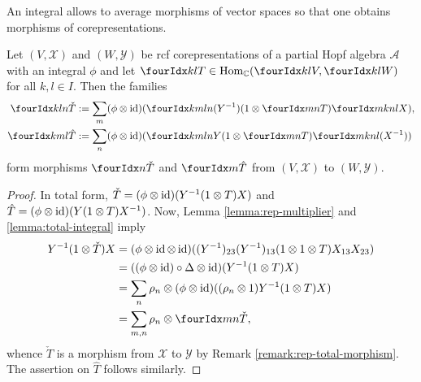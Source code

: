 An integral allows to average morphisms of vector spaces so that one
obtains morphisms of corepresentations. 
\begin{Lem} \label{lem:rep-average}  Let $(V,\mathscr{X})$ and
  $(W,\mathscr{Y})$ be rcf corepresentations of  a partial
  Hopf algebra $\mathscr{A}$ with an integral $\phi$ and let
  $\Gru{T}{k}{l} \in \Hom_{\C}(\Gru{V}{k}{l},\Gru{W}{k}{l})$ for all $k,l\in I$. Then the families
  \begin{align*}
    \Gr{\check T}{k}{l}{}{n} &:= \sum_{m} (\phi \otimes
    \id)(\Gr{(Y^{-1})}{k}{l}{m}{n}(1\otimes
    \Gru{T}{m}{n})\Gr{X}{m}{n}{k}{l}), \\
    \Gr{\hat T}{k}{l}{m}{} &:= \sum_{n} (\phi \otimes
    \id)(\Gr{Y}{k}{l}{m}{n}(1\otimes
    \Gru{T}{m}{n})\Gr{(X^{-1})}{m}{n}{k}{l})
  \end{align*}
form  morphisms $\Grd{\check{T}}{}{n}$ and $\Grd{\hat{T}}{m}{}$ from $(V,\mathscr{X})$ to $(W,\mathscr{Y})$. %
\end{Lem} 
\begin{proof}
  In total form, $\check{T}=(\phi \otimes \operatorname{id})(Y^{-1}(1 \otimes T)X)$
  and $\hat{T}=(\phi \otimes \operatorname{id})(Y(1 \otimes T)X^{-1})$.  Now, Lemma
  \ref{lemma:rep-multiplier} and \ref{lemma:total-integral} 
  imply
  \begin{align*}
    Y^{-1}(1 \otimes \check{T})X &= (\phi \otimes \id \otimes
    \id)((Y^{-1})_{23}(Y^{-1})_{13}(1 \otimes 1
    \otimes T)X_{13}X_{23})  \\
    &= ((\phi \otimes\id) \circ \Delta  \otimes \id)(Y^{-1}(1 \otimes T)X) \\
    &= \sum_{n} \rho_{n} \otimes (\phi \otimes \id)((\rho_{n} \otimes
    1)Y^{-1}(1 \otimes T)X)  \\
    &= \sum_{m,n} \rho_{n} \otimes \Gru{\check T}{m}{n},
  \end{align*}
  whence $\check{T}$ is a morphism from $\mathscr{X}$ to $\mathscr{Y}$
  by Remark \ref{remark:rep-total-morphism}. The assertion on $\hat
  T$ follows similarly.
\end{proof}


